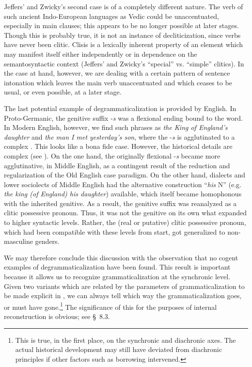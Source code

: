Jeffers' and Zwicky's second case is of a completely different nature. The verb of such ancient Indo-European languages as Vedic could be unaccentuated, especially in main clauses; this appears to be no longer possible at later stages. Though this is probably true, it is not an instance of decliticization, since verbs have never been clitic. Clisis is a lexically inherent property of an element which may manifest itself either independently or in dependence on the semantosyntactic context (Jeffers' and Zwicky's “special” vs. “simple” clitics). In the case at hand, however, we are dealing with a certain pattern of sentence intonation which leaves the main verb unaccentuated and which ceases to be usual, or even possible, at a later stage.

The last potential example of degrammaticalization is provided by English. In Proto-Germanic, the genitive suffix -\textit{s} was a flexional ending bound to the word. In Modern English, however, we find such phrases as \textit{the King of England's daughter} and \textit{the man I met yesterday's son}, where the -\textit{s} is agglutinated to a complex \np. This looks like a bona fide case. However, the historical details are complex (see \citealt{Janda1980}). On the one hand, the originally flexional -\textit{s} became more agglutinative, in Middle English, as a contingent result of the reduction and regularization of the Old English case paradigm. On the other hand, dialects and lower sociolects of Middle English had the alternative construction ``\np \textit{his} N'' (e.g. \textit{the king (of England) his daughter}) available, which itself became homophonous with the inherited genitive. As a result, the genitive suffix was reanalyzed as a clitic possessive pronoun. Thus, it was not the genitive on its own what expanded to higher syntactic levels. Rather, the (real or putative) clitic possessive pronoun, which had been compatible with these levels from start, got generalized to non-masculine genders.

We may therefore conclude this discussion with the observation that no cogent examples of degrammaticalization have been found. This result is important because it allows us to recognize grammaticalization at the synchronic level. Given two variants which are related by the parameters of grammaticalization to be made explicit in , we can always tell which way the grammaticalization goes, or must have gone.\footnote{This is true, in the first place, on the synchronic and diachronic axes. The actual historical development may still have deviated from diachronic principles if other factors such as borrowing intervened.} The significance of this for the purposes of internal reconstruction is obvious; see §~8.3.

